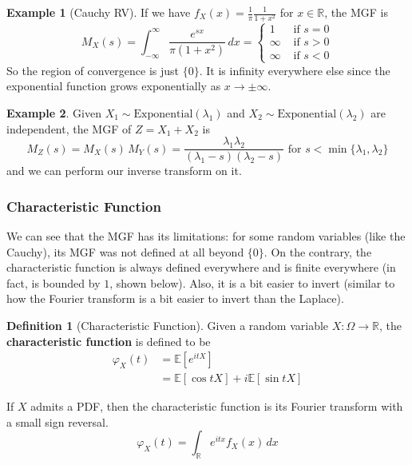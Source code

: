 \documentclass{article}
\theoremstyle{definition}
\newtheorem{example}{Example}[section]
\theoremstyle{remark}
\theoremstyle{definition}
\newtheorem{definition}{Definition}[section]
\begin{document}
\begin{example}[Cauchy RV]
If we have $f_X (x) = \frac{1}{\pi} \frac{1}{1 + x^2}$ for $x \in \mathbb{R}$, the MGF is 
\[M_X (s) = \int_{-\infty}^\infty \frac{e^{s x}}{\pi (1 + x^2)} \,dx = \begin{cases} 1 & \text{ if } s = 0 \\
\infty & \text{ if } s > 0 \\ 
\infty & \text{ if } s < 0 \end{cases}\]
So the region of convergence is just $\{0\}$. It is infinity everywhere else since the exponential function grows exponentially as $x \rightarrow \pm \infty$. 
\end{example}

\begin{example}
Given $X_1 \sim \mathrm{Exponential}(\lambda_1)$ and $X_2 \sim \mathrm{Exponential}(\lambda_2)$ are independent, the MGF of $Z = X_1 + X_2$ is 
\[M_Z (s) = M_X (s) \, M_Y (s) = \frac{\lambda_1 \lambda_2}{(\lambda_1 - s)(\lambda_2 - s)} \text{ for } s < \min\{\lambda_1, \lambda_2\}\]
and we can perform our inverse transform on it. 
\end{example}

\subsubsection{Characteristic Function}

We can see that the MGF has its limitations: for some random variables (like the Cauchy), its MGF was not defined at all beyond $\{0\}$. On the contrary, the characteristic function is always defined everywhere and is finite everywhere (in fact, is bounded by $1$, shown below). Also, it is a bit easier to invert (similar to how the Fourier transform is a bit easier to invert than the Laplace). 

\begin{definition}[Characteristic Function]
Given a random variable $X: \Omega \longrightarrow \mathbb{R}$, the \textbf{characteristic function} is defined to be 
\begin{align*}
    \varphi_X (t) & = \mathbb{E}[ e^{i t X} ] \\
    & = \mathbb{E}[\cos{t X}] + i \mathbb{E}[ \sin{t X}]
\end{align*}
\end{definition}

If $X$ admits a PDF, then the characteristic function is its Fourier transform with a small sign reversal. 
\[\varphi_X (t) = \int_\mathbb{R} e^{i t x} f_X (x)\,dx \]
\end{document}
